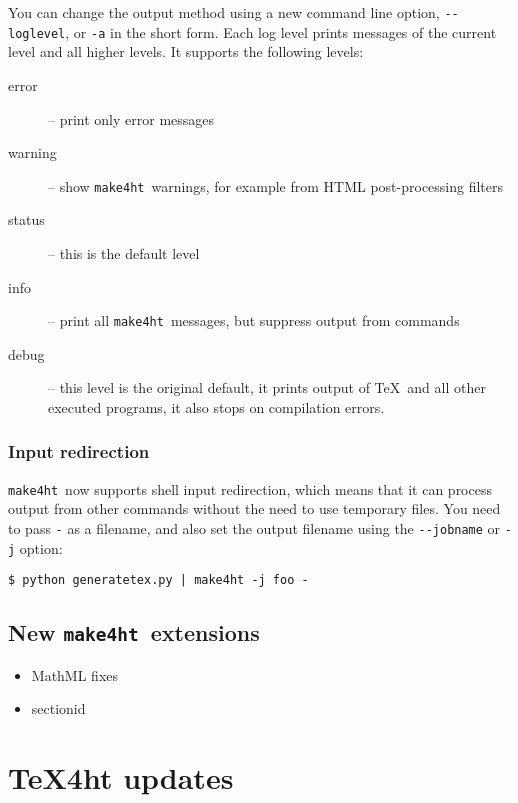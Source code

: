 \documentclass{ltugboat}
\newcommand\makefourht{\texttt{make4ht}}
\begin{document}
You can change the output method using a new command line option,
\verb|--loglevel|, or \verb|-a| in the short form. Each log level prints 
messages of the current level and all higher levels.
It supports the following levels:

\begin{description}
  \item[error] -- print only error messages
  \item[warning] -- show \makefourht\ warnings, for example from HTML post-processing filters
  \item[status] -- this is the default level 
  \item[info]  -- print all \makefourht\ messages, but suppress output from commands
  \item[debug] -- this level is the original default, it prints output of
    \TeX\ and all other executed programs, it also stops on compilation
    errors.
\end{description}

\subsubsection{Input redirection}

\makefourht\ now supports shell input redirection, which means that it can 
process output from other commands without the need to use temporary files.
You need to pass \verb|-| as a filename, and also set the output filename using
the \verb|--jobname| or \verb|-j| option:

\begin{verbatim}
$ python generatetex.py | make4ht -j foo -
\end{verbatim}



\subsection{New \makefourht\ extensions}



  \begin{itemize}
  \item MathML fixes
  \item sectionid
  \end{itemize}

\section{\TeX4ht updates}
\end{document}
